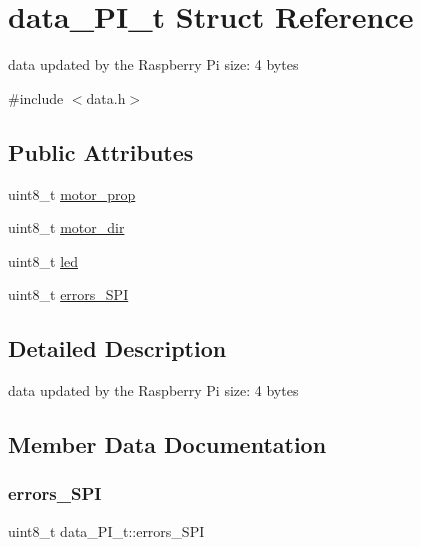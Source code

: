 \hypertarget{structdata___p_i__t}{}\section{data\+\_\+\+P\+I\+\_\+t Struct Reference}
\label{structdata___p_i__t}


data updated by the Raspberry Pi size\+: 4 bytes  




{\ttfamily \#include $<$data.\+h$>$}

\subsection*{Public Attributes}
\begin{DoxyCompactItemize}
\item 
uint8\+\_\+t \hyperlink{structdata___p_i__t_a6f934c30b868c2e4c5be658e9ad6038e}{motor\+\_\+prop}
\item 
uint8\+\_\+t \hyperlink{structdata___p_i__t_a5936671e7162e117f3126a707f376283}{motor\+\_\+dir}
\item 
uint8\+\_\+t \hyperlink{structdata___p_i__t_ac77dbc8ab27ec005a489d7b6e44ffaba}{led}
\item 
uint8\+\_\+t \hyperlink{structdata___p_i__t_a56fc6c2b4203fbb1de7443a668021479}{errors\+\_\+\+S\+PI}
\end{DoxyCompactItemize}


\subsection{Detailed Description}
data updated by the Raspberry Pi size\+: 4 bytes 

\subsection{Member Data Documentation}
\hypertarget{structdata___p_i__t_a56fc6c2b4203fbb1de7443a668021479}{}\label{structdata___p_i__t_a56fc6c2b4203fbb1de7443a668021479} 
\subsubsection{\texorpdfstring{errors\+\_\+\+S\+PI}{errors\_SPI}}
{\footnotesize\ttfamily uint8\+\_\+t data\+\_\+\+P\+I\+\_\+t\+::errors\+\_\+\+S\+PI}

